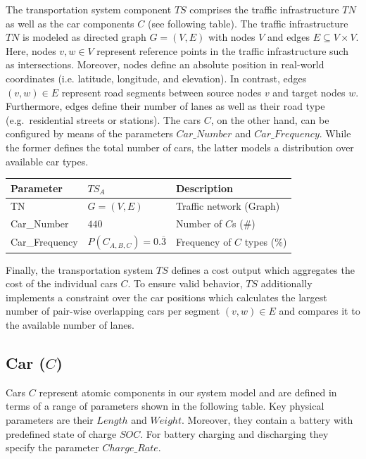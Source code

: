 The transportation system component $TS$ comprises the traffic infrastructure $TN$ as well as the car components $C$ (see following table). The traffic infrastructure $TN$ is modeled as directed graph $G = (V,E)$ with nodes $V$ and edges $E \subseteq V \times V$. Here, nodes $v,w \in V$ represent reference points in the traffic infrastructure such as intersections. Moreover, nodes define an absolute position in real-world coordinates (i.e. latitude, longitude, and elevation). In contrast, edges $(v,w) \in E$ represent road segments between source nodes $v$ and target nodes $w$. Furthermore, edges define their number of lanes as well as their road type (e.g.\ residential streets or stations). The cars $C$, on the other hand, can be configured by means of the parameters $Car\_Number$ and $Car\_Frequency$. While the former defines the total number of cars, the latter models a distribution over available car types. 

\begin{table}[h]
	\renewcommand{\arraystretch}{1.3}
	\centering
	\begin{tabularx}{\columnwidth}{llX}
		\hline
		\textbf{Parameter}     & \textbf{$TS_{A}$}         & \textbf{Description} \\ \hline
		TN              & $G = (V, E)$    & Traffic network (Graph)    \\
		Car\_Number            & $440$    & Number of $C$s (\#)      \\ 
		Car\_Frequency      & $P(C_{A,B,C}) = 0.\overline{3}$    & Frequency of $C$ types (\%)       \\ \hline
	\end{tabularx}
\end{table}

Finally, the transportation system $TS$ defines a cost output which aggregates the cost of the individual cars $C$. To ensure valid behavior, $TS$ additionally implements a constraint over the car positions which calculates the largest number of pair-wise overlapping cars per segment $(v,w) \in E$ and compares it to the available number of lanes.

\subsection{Car ($C$)}
\label{section:car}

Cars $C$ represent atomic components in our system model and are defined in terms of a range of parameters shown in the following table. Key physical parameters are their $Length$ and $Weight$. Moreover, they contain a battery with predefined state of charge $SOC$. For battery charging and discharging they specify the parameter $Charge\_Rate$.

